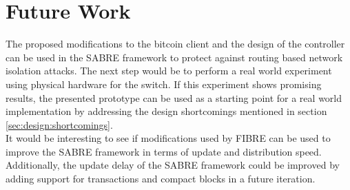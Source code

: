 \chapter{\label{outlook}Future Work}
The proposed modifications to the bitcoin client and the design of the controller can be used in the SABRE framework to protect against routing based network isolation attacks. The next step would be to perform a real world experiment using physical hardware for the switch. If this experiment shows promising results, the presented prototype can be used as a starting point for a real world implementation by addressing the design shortcomings mentioned in section \ref{sec:design:shortcomings}.\\
It would be interesting to see if modifications used by FIBRE can be used to improve the SABRE framework in terms of update and distribution speed. Additionally, the update delay of the SABRE framework could be improved by adding support for transactions and compact blocks in a future iteration.\\
